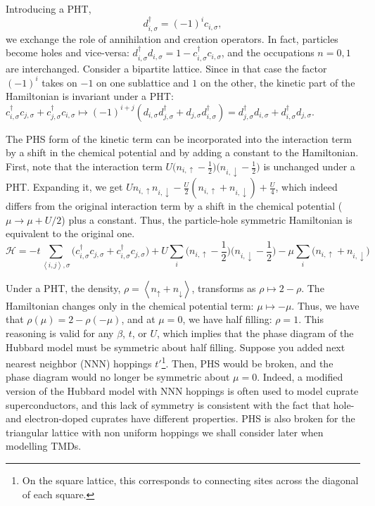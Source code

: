 Introducing a \ac{PHT},
\begin{equation}\label{eq:PHT}
d_{ i, \sigma}^\dagger = (-1)^i c_{i, \sigma} ,
\end{equation}
we exchange the role of annihilation and creation operators.
In fact, particles become holes and vice-versa: $d_{ i, \sigma}^\dagger d_{ i, \sigma} = 1 - c_{ i, \sigma}^\dagger c_{ i, \sigma} $, and the occupations $n = 0, 1$ are interchanged.
Consider a bipartite lattice.
Since in that case the factor $(-1)^i$ takes on $-1$ on one sublattice and $1$ on the other, the kinetic part of the Hamiltonian is invariant under a \ac{PHT}: $
c_{i, \sigma}^\dagger c_{j, \sigma} + c_{j, \sigma}^\dagger c_{i, \sigma} \mapsto (-1)^{i+j} ( d_{i, \sigma} d_{j, \sigma}^\dagger + d_{j, \sigma} d_{i, \sigma}^\dagger ) = d_{j, \sigma}^\dagger d_{i, \sigma} + d_{i, \sigma}^\dagger d_{j, \sigma}
$.

The \ac{PHS} form of the kinetic term can be incorporated into the interaction term by a shift in the chemical potential and by adding a constant to the Hamiltonian.
First, note that the interaction term $
U \big( n_{i,\uparrow} - \frac{1}{2} \big) \big( n_{i,\downarrow} - \frac{1}{2} \big)
$
is unchanged under a \ac{PHT}.
Expanding it, we get $U n_{i,\uparrow} n_{i,\downarrow} - \frac{U}{2} (n_{i,\uparrow} + n_{i,\downarrow}) + \frac{U}{4}$, which indeed differs from the original interaction term by a shift in the chemical potential ($\mu \rightarrow \mu + U / 2$) plus a constant.
Thus, the particle-hole symmetric Hamiltonian is equivalent to the original one.
\begin{equation}
\mathcal{H} = -t \sum_{\left\langle i, j \right \rangle, \sigma} \bigg( c_{i,\sigma}^\dagger c_{j,\sigma} + c_{i,\sigma}^\dagger c_{j,\sigma} \bigg) + U \sum_{i} \bigg( n_{i,\uparrow} - \frac{1}{2} \bigg) \bigg( n_{i,\downarrow} - \frac{1}{2} \bigg) -\mu \sum_i \bigg( n_{i,\uparrow} + n_{i,\downarrow} \bigg)
\end{equation}

Under a \ac{PHT}, the density, $\rho = \left\langle n_\uparrow + n_\downarrow \right\rangle$, transforms as $\rho \mapsto 2 - \rho$.
The Hamiltonian changes only in the chemical potential term: $\mu \mapsto -\mu$.
Thus, we have that $\rho (\mu) = 2 - \rho (-\mu)$, and at $\mu = 0$, we have half filling: $\rho = 1$.
This reasoning is valid for any $\beta$, $t$, or $U$, which implies that the phase diagram of the Hubbard model must be symmetric about half filling.
Suppose you added next nearest neighbor (NNN) hoppings $t'$\footnote{On the square lattice, this corresponds to connecting sites across the diagonal of each square.}.
Then, \ac{PHS} would be broken, and the phase diagram would no longer be symmetric about $\mu = 0$.
Indeed, a modified version of the Hubbard model with NNN hoppings is often used to model cuprate superconductors, and this lack of symmetry is consistent with the fact that hole- and electron-doped cuprates have different properties. 
\ac{PHS} is also broken for the triangular lattice with non uniform hoppings we shall consider later when modelling \acp{TMD}.